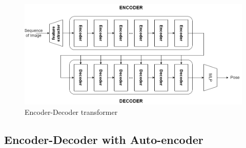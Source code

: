 \begin{figure}[H]
    \centering
    \includegraphics[width=\textwidth]{images/4_encoder_decoder}
    \caption{Encoder-Decoder transformer}\label{fig:figure-encoder-decoder-transformer}
\end{figure}

\subsection{Encoder-Decoder with Auto-encoder}\label{subsec:encoder-decoder-with-auto-encoder}
